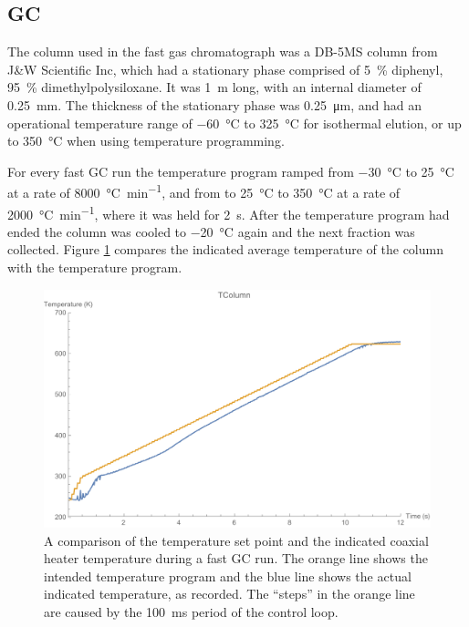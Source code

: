 \subsection{GC}

The column used in the fast gas chromatograph was a DB-5MS column from J\&W
Scientific Inc, which had a stationary phase comprised of \SI{5}{\percent}
diphenyl, \SI{95}{\percent} di\-meth\-yl\-poly\-si\-lox\-ane. It was
\SI{1}{\metre} long, with an internal diameter of \SI{0.25}{\milli\metre}. The
thickness of the stationary phase was \SI{0.25}{\micro\metre}, and had an
operational temperature range of \SI{-60}{\celsius} to \SI{325}{\celsius} for
isothermal elution, or up to \SI{350}{\celsius} when using temperature
programming.

For every fast GC run the temperature program ramped from \SI{-30}{\celsius} to
\SI{25}{\celsius} at a rate of \SI{8000}{\celsius\per\minute}, and from to
\SI{25}{\celsius} to \SI{350}{\celsius} at a rate of
\SI{2000}{\celsius\per\minute}, where it was held for \SI{2}{s}. After the
temperature program had ended the column was cooled to \SI{-20}{\celsius} again
and the next fraction was collected. Figure \ref{fig:Setpoint_Following}
compares the indicated average temperature of the column with the temperature
program.

\begin{figure}
	\centering
	\includegraphics[width=\textwidth]{Figures/Setpoint_Following.pdf}
	\decoRule	
	
\caption[The fidelity of a fast GC temperature program]{A comparison of the
temperature set point and the indicated coaxial heater temperature during a fast
GC run. The orange line shows the intended temperature program and the blue line
shows the actual indicated temperature, as recorded. The ``steps'' in the orange
line are caused by the \SI{100}{\milli\second} period of the control loop.}

	\label{fig:Setpoint_Following} 
\end{figure}

